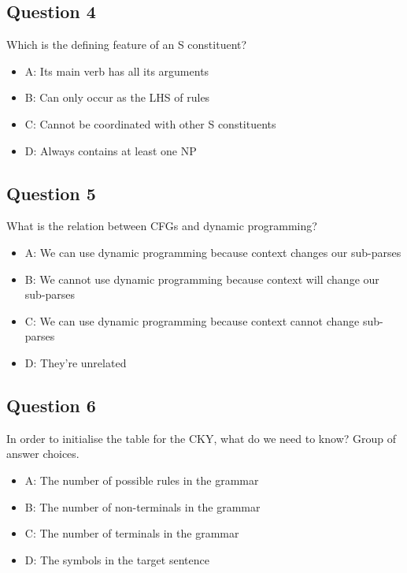 \documentclass[
  11pt,
  british,
]{article}
\providecommand{\tightlist}{%
  \setlength{\itemsep}{0pt}\setlength{\parskip}{0pt}}
\begin{document}
\hypertarget{question-4-5}{%
\subsection{Question 4}\label{question-4-5}}

Which is the defining feature of an S constituent?

\begin{itemize}
\tightlist
\item
  A: Its main verb has all its arguments
\item
  B: Can only occur as the LHS of rules
\item
  C: Cannot be coordinated with other S constituents
\item
  D: Always contains at least one NP
\end{itemize}

\hypertarget{question-5-5}{%
\subsection{Question 5}\label{question-5-5}}

What is the relation between CFGs and dynamic programming?

\begin{itemize}
\tightlist
\item
  A: We can use dynamic programming because context changes our
  sub-parses
\item
  B: We cannot use dynamic programming because context will change our
  sub-parses
\item
  C: We can use dynamic programming because context cannot change
  sub-parses
\item
  D: They're unrelated
\end{itemize}

\hypertarget{question-6-5}{%
\subsection{Question 6}\label{question-6-5}}

In order to initialise the table for the CKY, what do we need to know?
Group of answer choices.

\begin{itemize}
\tightlist
\item
  A: The number of possible rules in the grammar
\item
  B: The number of non-terminals in the grammar
\item
  C: The number of terminals in the grammar
\item
  D: The symbols in the target sentence
\end{itemize}
\end{document}
